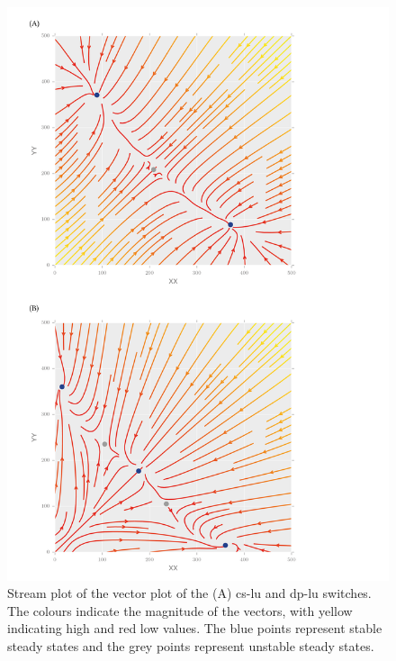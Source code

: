 {\begin{figure}[htbp]
\begin{center}
	\includegraphics[scale=0.5]{chapterStabilityFinder/images/lu_bifurc.png}
	\caption[LoF caption]{\label{fig:lu_bifurc}  Stream plot of the vector plot of the (A) \acrshort{cs-lu} and \acrshort{dp-lu} switches. The colours indicate the magnitude of the vectors, with yellow indicating high and red low values. The blue points represent stable steady states and the grey points represent unstable steady states.  }
\end{center}
\end{figure}




}
